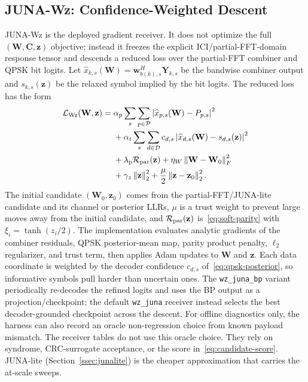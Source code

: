 \documentclass[journal]{IEEEtran}
\newcommand{\Ht}{^{H}}
\newcommand{\norm}[1]{\left\lVert #1 \right\rVert}
\newcommand{\abs}[1]{\left\lvert #1 \right\rvert}
\newcommand{\junalite}{JUNA-lite}
\newcommand{\junawz}{JUNA-Wz}
\begin{document}
\subsection{\texorpdfstring{\junawz{}}{JUNA-Wz}: Confidence-Weighted
Descent}\label{ssec:gradient-juna}
\junawz{} is the deployed gradient receiver. It does not optimize the full
$(\mathbf W,\mathbf C,\mathbf z)$ objective; instead it freezes the explicit
ICI/partial-FFT-domain response tensor and descends a reduced loss over the partial-FFT
combiner and QPSK bit logits. Let
$\widehat x_{k,s}(\mathbf W)=\mathbf w_{b(k),s}\Ht\mathbf Y_{k,s}$ be the
bandwise combiner output and $s_{k,s}(\mathbf z)$ be the relaxed symbol implied
by the bit logits. The reduced loss has the form
\begin{equation}
  \begin{aligned}
  \mathcal L_{\rm Wz}(\mathbf W,\mathbf z)
  ={}&
  \alpha_p\sum_s\sum_{p\in\mathcal P}
       \abs{\widehat x_{p,s}(\mathbf W)-P_{p,s}}^2\\
  &+\alpha_t\sum_s\sum_{d\in\mathcal D}
       c_{d,s}\abs{\widehat x_{d,s}(\mathbf W)-s_{d,s}(\mathbf z)}^2\\
  &+\lambda_{\rm p}\mathcal R_{\rm par}(\mathbf z)
   +\eta_W\norm{\mathbf W-\mathbf W_0}_F^2\\
  &+\gamma_z\norm{\mathbf z}_2^2
   +\frac{\mu}{2}\norm{\mathbf z-\mathbf z_0}_2^2 .
  \end{aligned}
  \label{eq:gradient-rescue}
\end{equation}
The initial candidate $(\mathbf W_0,\mathbf z_0)$ comes from the partial-FFT/\junalite{}
candidate and its channel or posterior LLRs, $\mu$ is a trust weight to prevent
large moves away from the initial candidate, and
$\mathcal R_{\rm par}(\mathbf z)$ is~\eqref{eq:soft-parity} with
$\xi_i=\tanh(z_i/2)$. The implementation evaluates analytic gradients of the
combiner residuals, QPSK posterior-mean map, parity product penalty, $\ell_2$
regularizer, and trust term, then applies Adam updates to $\mathbf W$ and
$\mathbf z$. Each data coordinate is weighted by the decoder confidence
$c_{d,s}$ of~\eqref{eq:qpsk-posterior}, so informative symbols pull harder than
uncertain ones. The \texttt{wz\_juna\_bp} variant periodically re-decodes the
refined logits and uses the BP output as a projection/checkpoint; the default
\texttt{wz\_juna} receiver instead selects the best decoder-grounded checkpoint
across the descent. For offline diagnostics only, the harness can also record an
oracle non-regression choice from known payload mismatch. The receiver tables do
not use this oracle choice. They rely on syndrome, CRC-surrogate acceptance, or
the score in~\eqref{eq:candidate-score}. \junalite{}
(Section~\ref{ssec:junalite}) is the cheaper approximation that carries the
at-scale sweeps.
\end{document}
